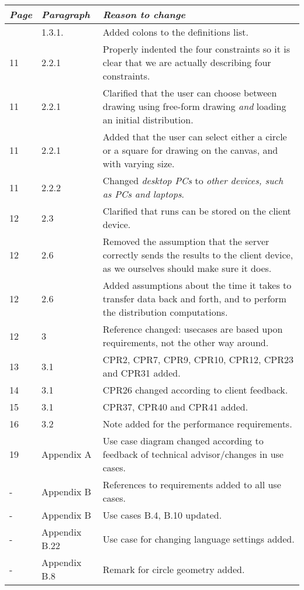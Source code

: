 \begin{longtable}{|l|l|p{11cm}|}
    \hline
    \emph{Page} &   \emph{Paragraph}    &   \emph{Reason to change}\\
    \hline
    \endhead
    \hline
    \endfoot
    5 & 1.3.1. & Added colons to the definitions list. \\
    11 & 2.2.1 & Properly indented the four constraints so it is clear that we are actually describing four constraints.\\
    11 & 2.2.1 & Clarified that the user can choose between drawing using free-form drawing \emph{and} loading an initial distribution.\\
    11 & 2.2.1 & Added that the user can select either a circle or a square for drawing on the canvas, and with varying size.\\
    11 & 2.2.2 & Changed \emph{desktop PCs} to \emph{other devices, such as PCs and laptops}.\\
    12 & 2.3   & Clarified that runs can be stored on the client device.\\
    12 & 2.6   & Removed the assumption that the server correctly sends the results to the client device, as we ourselves should make sure it does.\\
    12 & 2.6   & Added assumptions about the time it takes to transfer data back and forth, and to perform the distribution computations.\\
        12 & 3 & Reference changed: usecases are based upon requirements, not the other way around. \\
        13 & 3.1 & CPR2, CPR7, CPR9, CPR10, CPR12, CPR23 and CPR31 added.\\
    14 & 3.1 & CPR26 changed according to client feedback.\\
    15 & 3.1 & CPR37, CPR40 and CPR41 added.\\
    16 & 3.2 & Note added for the performance requirements.\\
    19 & Appendix A & Use case diagram changed according to feedback of technical advisor/changes in use cases.\\
    - & Appendix B & References to requirements added to all use cases.\\
    - & Appendix B & Use cases B.4, B.10 updated.\\
    - & Appendix B.22 & Use case for changing language settings added.\\
    - & Appendix B.8 & Remark for circle geometry added.\\
\end{longtable}

